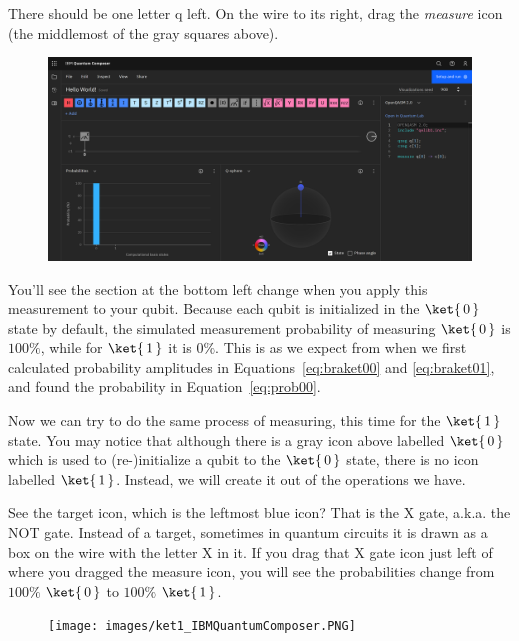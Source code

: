 \documentclass{article}
\theoremstyle{definition}
\newcommand{\kz}[1]{\ket{\,#1\,}}
\begin{document}
There should be one letter q left.  On the wire to its right, drag the \textit{measure} icon (the middlemost of the gray squares above).
\begin{figure}[H]
	\includegraphics[width=\columnwidth]{images/Measure_IBMQuantumComposer.PNG}
\end{figure}
You'll see the section at the bottom left change when you apply this measurement to your qubit.  Because each qubit is initialized in the $\kz0$ state by default, the simulated measurement probability of measuring $\kz0$ is $100\%$, while for $\kz1$ it is $0\%$.  This is as we expect from when we first calculated probability amplitudes in Equations~\ref{eq:braket00} and \ref{eq:braket01}, and found the probability in Equation~\ref{eq:prob00}.

Now we can try to do the same process of measuring, this time for the $\kz1$ state.  You may notice that although there is a gray icon above labelled $\kz0$ which is used to (re-)initialize a qubit to the $\kz0$ state, there is no icon labelled $\kz1$.  Instead, we will create it out of the operations we have.

See the target icon, which is the leftmost blue icon?  That is the X gate, a.k.a. the NOT gate.  Instead of a target, sometimes in quantum circuits it is drawn as a box on the wire with the letter X in it.
If you drag that X gate icon just left of where you dragged the measure icon, you will see the probabilities change from $100\%$ $\kz0$ to $100\%$ $\kz1$.
\begin{figure}[H]
	\texttt{[image: images/ket1\_IBMQuantumComposer.PNG]}
	\label{fig:myfirstcircuit}
\end{figure}
\end{document}
